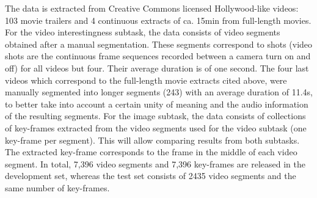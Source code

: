 \documentclass[sigconf]{acmart-me}
\begin{document}
The data is extracted from Creative Commons licensed Hollywood-like videos: 103 movie trailers and 4 continuous extracts of ca. 15min from full-length movies. 
For the video interestingness subtask, the data consists of video segments obtained after a manual segmentation. These segments correspond to shots (video shots are the continuous frame sequences recorded between a camera turn on and off) for all videos but four. Their average duration is of one second. The four last videos which correspond to the full-length movie extracts cited above, were manually segmented into longer segments (243) with an average duration of 11.4s, to better take into account a certain unity of meaning and the audio information of the resulting segments. For the image subtask, the data consists of collections of key-frames extracted from the video segments used for the video subtask (one key-frame per segment). This will allow comparing results from both subtasks. The extracted key-frame corresponds to the frame in the middle of each video segment.
In total, 7,396 video segments and 7,396 key-frames are released in the development set, whereas the test set consists of 2435 video segments and the same number of key-frames.

\end{document}

